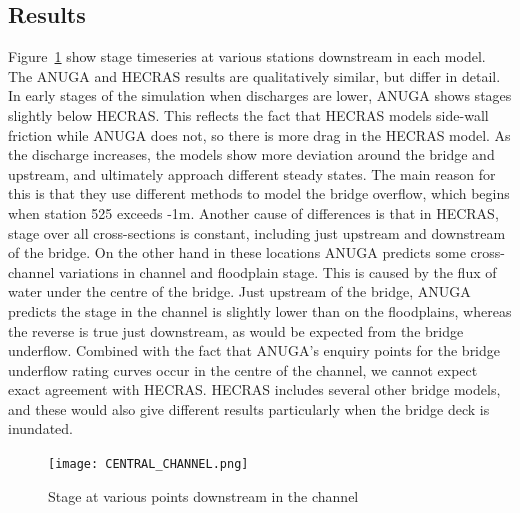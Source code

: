 \subsection{Results}

Figure~\ref{Reach} show stage timeseries at various stations downstream in each
model. The ANUGA and HECRAS results are qualitatively similar, but differ in
detail. In early stages of the simulation when discharges are lower, ANUGA
shows stages slightly below HECRAS. This reflects the fact that HECRAS models
side-wall friction while ANUGA does not, so there is more drag in the HECRAS
model. As the discharge increases, the models show more deviation around the
bridge and upstream, and ultimately approach different steady states. The main
reason for this is that they use different methods to model the bridge
overflow, which begins when station 525 exceeds -1m. Another cause of
differences is that in HECRAS, stage over all cross-sections is constant,
including just upstream and downstream of the bridge. On the other hand in
these locations ANUGA predicts some cross-channel variations in channel and
floodplain stage. This is caused by the flux of water under the centre of the
bridge. Just upstream of the bridge, ANUGA predicts the stage in the channel is
slightly lower than on the floodplains, whereas the reverse is true just
downstream, as would be expected from the bridge underflow. Combined with the
fact that ANUGA's enquiry points for the bridge underflow rating curves occur
in the centre of the channel, we cannot expect exact agreement with HECRAS.
HECRAS includes several other bridge models, and these would also give
different results particularly when the bridge deck is inundated. 

\begin{figure}
\begin{center}
\texttt{[image: CENTRAL\_CHANNEL.png]}
\end{center}
\caption{Stage at various points downstream in the channel}
\label{Reach}
\end{figure}

